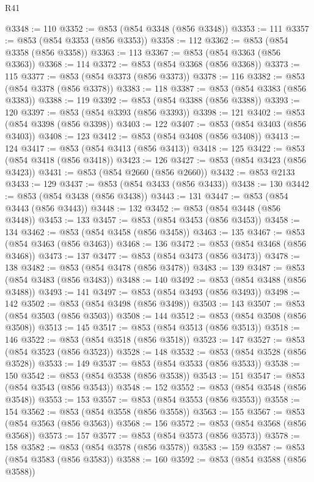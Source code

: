 \begin{lexlean}{R41}
\begin{coremodule}
@3348 := 110
@3352 := @853 (@854 @3348 (@856 @3348))
@3353 := 111
@3357 := @853 (@854 @3353 (@856 @3353))
@3358 := 112
@3362 := @853 (@854 @3358 (@856 @3358))
@3363 := 113
@3367 := @853 (@854 @3363 (@856 @3363))
@3368 := 114
@3372 := @853 (@854 @3368 (@856 @3368))
@3373 := 115
@3377 := @853 (@854 @3373 (@856 @3373))
@3378 := 116
@3382 := @853 (@854 @3378 (@856 @3378))
@3383 := 118
@3387 := @853 (@854 @3383 (@856 @3383))
@3388 := 119
@3392 := @853 (@854 @3388 (@856 @3388))
@3393 := 120
@3397 := @853 (@854 @3393 (@856 @3393))
@3398 := 121
@3402 := @853 (@854 @3398 (@856 @3398))
@3403 := 122
@3407 := @853 (@854 @3403 (@856 @3403))
@3408 := 123
@3412 := @853 (@854 @3408 (@856 @3408))
@3413 := 124
@3417 := @853 (@854 @3413 (@856 @3413))
@3418 := 125
@3422 := @853 (@854 @3418 (@856 @3418))
@3423 := 126
@3427 := @853 (@854 @3423 (@856 @3423))
@3431 := @853 (@854 @2660 (@856 @2660))
@3432 := @853 @2133
@3433 := 129
@3437 := @853 (@854 @3433 (@856 @3433))
@3438 := 130
@3442 := @853 (@854 @3438 (@856 @3438))
@3443 := 131
@3447 := @853 (@854 @3443 (@856 @3443))
@3448 := 132
@3452 := @853 (@854 @3448 (@856 @3448))
@3453 := 133
@3457 := @853 (@854 @3453 (@856 @3453))
@3458 := 134
@3462 := @853 (@854 @3458 (@856 @3458))
@3463 := 135
@3467 := @853 (@854 @3463 (@856 @3463))
@3468 := 136
@3472 := @853 (@854 @3468 (@856 @3468))
@3473 := 137
@3477 := @853 (@854 @3473 (@856 @3473))
@3478 := 138
@3482 := @853 (@854 @3478 (@856 @3478))
@3483 := 139
@3487 := @853 (@854 @3483 (@856 @3483))
@3488 := 140
@3492 := @853 (@854 @3488 (@856 @3488))
@3493 := 141
@3497 := @853 (@854 @3493 (@856 @3493))
@3498 := 142
@3502 := @853 (@854 @3498 (@856 @3498))
@3503 := 143
@3507 := @853 (@854 @3503 (@856 @3503))
@3508 := 144
@3512 := @853 (@854 @3508 (@856 @3508))
@3513 := 145
@3517 := @853 (@854 @3513 (@856 @3513))
@3518 := 146
@3522 := @853 (@854 @3518 (@856 @3518))
@3523 := 147
@3527 := @853 (@854 @3523 (@856 @3523))
@3528 := 148
@3532 := @853 (@854 @3528 (@856 @3528))
@3533 := 149
@3537 := @853 (@854 @3533 (@856 @3533))
@3538 := 150
@3542 := @853 (@854 @3538 (@856 @3538))
@3543 := 151
@3547 := @853 (@854 @3543 (@856 @3543))
@3548 := 152
@3552 := @853 (@854 @3548 (@856 @3548))
@3553 := 153
@3557 := @853 (@854 @3553 (@856 @3553))
@3558 := 154
@3562 := @853 (@854 @3558 (@856 @3558))
@3563 := 155
@3567 := @853 (@854 @3563 (@856 @3563))
@3568 := 156
@3572 := @853 (@854 @3568 (@856 @3568))
@3573 := 157
@3577 := @853 (@854 @3573 (@856 @3573))
@3578 := 158
@3582 := @853 (@854 @3578 (@856 @3578))
@3583 := 159
@3587 := @853 (@854 @3583 (@856 @3583))
@3588 := 160
@3592 := @853 (@854 @3588 (@856 @3588))

\end{coremodule}
\end{lexlean}
